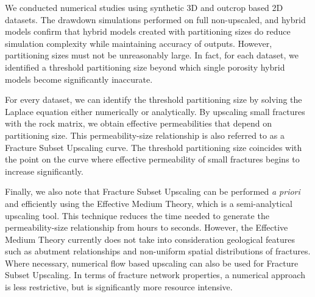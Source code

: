 \documentclass[draft]{agujournal2018}
\begin{document}
We conducted numerical studies using synthetic 3D and outcrop based 2D datasets. The drawdown simulations performed on full non-upscaled, and hybrid models confirm that hybrid models created with partitioning sizes do reduce simulation complexity while maintaining accuracy of outputs. However, partitioning sizes must not be unreasonably large. In fact, for each dataset, we identified a threshold partitioning size beyond which single porosity hybrid models become significantly inaccurate.

For every dataset, we can identify the threshold partitioning size by solving the Laplace equation either numerically or analytically. By upscaling small fractures with the rock matrix, we obtain effective permeabilities that depend on partitioning size. This permeability-size relationship is also referred to as a Fracture Subset Upscaling curve. The threshold partitioning size coincides with the point on the curve where effective permeability of small fractures begins to increase significantly. 

Finally, we also note that Fracture Subset Upscaling can be performed \textit{a priori} and efficiently using the Effective Medium Theory, which is a semi-analytical upscaling tool. This technique reduces the time needed to generate the permeability-size relationship from hours to seconds. However, the Effective Medium Theory currently does not take into consideration geological features such as abutment relationships and non-uniform spatial distributions of fractures. Where necessary, numerical flow based upscaling can also be used for Fracture Subset Upscaling. In terms of fracture network properties, a numerical approach is less restrictive, but is significantly more resource intensive.


\end{document}
